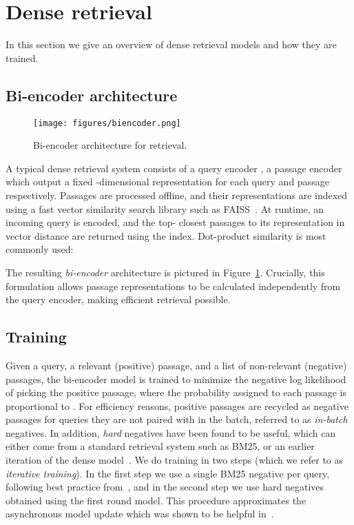 \documentclass[11pt]{article}
\begin{document}
\section{Dense retrieval}
In this section we give an overview of dense retrieval models and how they are trained.

\subsection{Bi-encoder architecture}
\begin{figure}
    \centering
    \texttt{[image: figures/biencoder.png]}
    \caption{Bi-encoder architecture for retrieval.}
    \label{fig:biencoder}
\end{figure} A typical dense retrieval system consists of a query encoder , a passage encoder  which output a fixed -dimensional representation for each query and passage respectively.  Passages are processed offline, and their representations are indexed using a fast vector similarity search library such as FAISS~\citep{faiss}.  At runtime, an incoming query is encoded, and the top- closest passages to its representation in vector distance are returned using the index.  Dot-product similarity is most commonly used:

The resulting \textit{bi-encoder} architecture is pictured in Figure~\ref{fig:biencoder}.  Crucially, this formulation allows passage representations to be calculated independently from the query encoder, making efficient retrieval possible.

\subsection{Training}  
Given a query, a relevant (positive) passage, and a list of non-relevant (negative) passages, the bi-encoder model is trained to minimize the negative log likelihood of picking the positive passage, where the probability assigned to each passage is proportional to .  For efficiency reasons, positive passages are recycled as negative passages for queries they are not paired with in the batch, referred to as \textit{in-batch} negatives.  In addition, \textit{hard} negatives have been found to be useful, which can either come from a standard retrieval system such as BM25, or an earlier iteration of the dense model~\citep{xiong2020approximate}.  We do training in two steps (which we refer to as \textit{iterative training}).  In the first step we use a single BM25 negative per query, following best practice from~\citet{dpr}, and in the second step we use hard negatives obtained using the first round model. This procedure approximates the asynchronous model update which was shown to be helpful in~\citet{xiong2020approximate}. 
\end{document}
